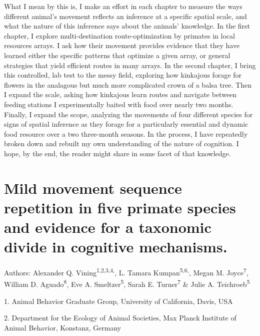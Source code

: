 \documentclass[twoside,12pt,final]{ucthesis-CA2012}
\begin{document}
\begin{ucmainmatter}
What I mean by this is, I make an effort in each chapter to measure the ways different animal's movement reflects an inference at a specific spatial scale, and what the nature of this inference says about the animals' knowledge. In the first chapter, I explore multi-destination route-optimization by primates in local resources arrays. I ask how their movement provides evidence that they have learned either the specific patterns that optimize a given array, or general strategies that yield efficient routes in many arrays. In the second chapter, I bring this controlled, lab test to the messy field, exploring how kinkajous forage for flowers in the analagous but much more complicated crown of a balsa tree. Then I expand the scale, asking how kinkajous learn routes and navigate between feeding stations I experimentally baited with food over nearly two months. Finally, I expand the scope, analyzing the movements of four different species for signs of spatial inference as they forage for a particularly essential and dynamic food resource over a two three-month seasons. In the process, I have repeatedly broken down and rebuilt my own understanding of the nature of cognition. I hope, by the end, the reader might share in some facet of that knowledge.

\hypertarget{mild-movement-sequence-repetition-in-five-primate-species-and-evidence-for-a-taxonomic-divide-in-cognitive-mechanisms.}{%
\chapter{Mild movement sequence repetition in five primate species and evidence for a taxonomic divide in cognitive mechanisms.}\label{mild-movement-sequence-repetition-in-five-primate-species-and-evidence-for-a-taxonomic-divide-in-cognitive-mechanisms.}}


Authors: Alexander Q. Vining\textsuperscript{1,2,3,4,\dag}, L. Tamara Kumpan\textsuperscript{5,6,\dag}, Megan M. Joyce\textsuperscript{7}, William D. Aguado\textsuperscript{8}, Eve A. Smeltzer\textsuperscript{5}, Sarah E. Turner\textsuperscript{7} \& Julie A. Teichroeb\textsuperscript{5}

\par
\begin{scriptsize}
1.  Animal Behavior Graduate Group, University of California, Davis, USA

2.  Department for the Ecology of Animal Societies, Max Planck Institute of Animal Behavior, Konstanz, Germany


\end{scriptsize}
\end{ucmainmatter}
\end{document}
